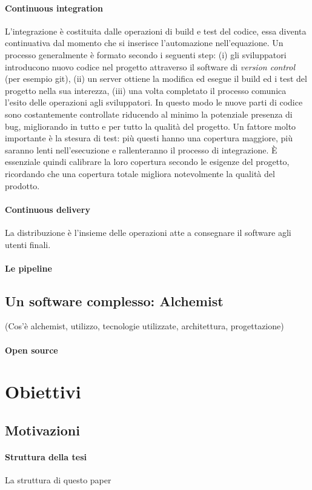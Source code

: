 \paragraph{Continuous integration} L'integrazione è costituita dalle operazioni di build e test del codice, essa diventa continuativa dal momento che si inserisce l'automazione nell'equazione. Un processo generalmente è formato secondo i seguenti step: (i) gli sviluppatori introducono nuovo codice nel progetto attraverso il software di \textit{version control} (per esempio git), (ii) un server ottiene la modifica ed esegue il build ed i test del progetto nella sua interezza, (iii) una volta completato il processo comunica l'esito delle operazioni agli sviluppatori. In questo modo le nuove parti di codice sono costantemente controllate riducendo al minimo la potenziale presenza di bug, migliorando in tutto e per tutto la qualità del progetto.
Un fattore molto importante è la stesura di test: più questi hanno una copertura maggiore, più saranno lenti nell'esecuzione e rallenteranno il processo di integrazione. È essenziale quindi calibrare la loro copertura secondo le esigenze del progetto, ricordando che una copertura totale migliora notevolmente la qualità del prodotto.

\paragraph{Continuous delivery} La distribuzione è l'insieme delle operazioni atte a consegnare il software agli utenti finali.

\paragraph{Le pipeline}

\subsection{Un software complesso: Alchemist}\label{sec:alchemist}

(Cos'è alchemist, utilizzo, tecnologie utilizzate, architettura, progettazione)

\paragraph{Open source}

\section{Obiettivi}

\subsection{Motivazioni}

\paragraph{Struttura della tesi}

La struttura di questo paper
